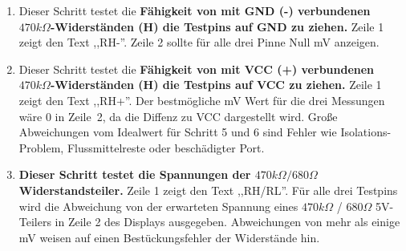 \begin{enumerate}
\item Dieser Schritt testet die {\bf Fähigkeit von mit GND (-) verbundenen \(470k\Omega\)-Widerständen (H) die Testpins auf GND zu ziehen.}
Zeile 1 zeigt den Text ,,RH-''.
Zeile 2 sollte für alle drei Pinne  Null mV anzeigen.

\item Dieser Schritt testet die {\bf Fähigkeit von mit VCC (+) verbundenen \(470k\Omega\)-Widerständen (H) die Testpins auf VCC zu ziehen.}
Zeile 1 zeigt den Text ,,RH+''.
Der bestmögliche mV Wert für die drei Messungen wäre 0 in Zeile~2, da die Diffenz zu VCC dargestellt wird.
Große Abweichungen vom Idealwert für Schritt 5 und 6 sind Fehler wie Isolations-Problem, Flussmittelreste oder beschädigter Port.

\item {\bf Dieser Schritt testet die Spannungen der \(470 k\Omega / 680 \Omega\)  Widerstandsteiler.}
Zeile 1 zeigt den Text ,,RH/RL''.
Für alle drei Testpins wird die Abweichung von der erwarteten Spannung eines \(470 k\Omega\) / \(680 \Omega\) 5V-Teilers 
in Zeile 2 des Displays ausgegeben.
Abweichungen von mehr als einige mV weisen auf einen Bestückungsfehler der Widerstände hin.


\end{enumerate}
